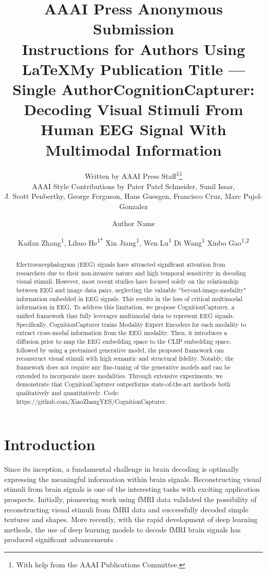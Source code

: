 \documentclass[letterpaper]{article} %
\title{AAAI Press Anonymous Submission\\Instructions for Authors Using \LaTeX{}}
\author{
    Written by AAAI Press Staff\textsuperscript{\rm 1}\thanks{With help from the AAAI Publications Committee.}\\
    AAAI Style Contributions by Pater Patel Schneider,
    Sunil Issar,\\
    J. Scott Penberthy,
    George Ferguson,
    Hans Guesgen,
    Francisco Cruz\equalcontrib,
    Marc Pujol-Gonzalez\equalcontrib
}
\title{My Publication Title --- Single Author}
\author {
    Author Name
}
\title{CognitionCapturer: Decoding Visual Stimuli From Human EEG Signal With Multimodal Information}
\author {
    Kaifan Zhang\textsuperscript{\rm 1},
    Lihuo He\textsuperscript{\rm 1*}
    Xin Jiang\textsuperscript{\rm 1},
    Wen Lu\textsuperscript{\rm 1}
    Di Wang\textsuperscript{\rm 1}
    Xinbo Gao\textsuperscript{\rm 1,2}
}
\begin{document}
\maketitle


\begin{abstract}

Electroencephalogram (EEG) signals have attracted significant attention from researchers due to their non-invasive nature and high temporal sensitivity in decoding visual stimuli. However, most recent studies have focused solely on the relationship between EEG and image data pairs, neglecting the valuable ``beyond-image-modality" information embedded in EEG signals. This results in the loss of critical multimodal information in EEG. To address this limitation, we propose CognitionCapturer, a unified framework that fully leverages multimodal data to represent EEG signals. Specifically, CognitionCapturer trains Modality Expert Encoders for each modality to extract cross-modal information from the EEG modality. Then, it introduces a diffusion prior to map the EEG embedding space to the CLIP embedding space, followed by using a pretrained generative model, the proposed framework can reconstruct visual stimuli with high semantic and structural fidelity. Notably, the framework does not require any fine-tuning of the generative models and can be extended to incorporate more modalities. Through extensive experiments, we demonstrate that CognitionCapturer outperforms state-of-the-art methods both qualitatively and quantitatively. Code: https://github.com/XiaoZhangYES/CognitionCapturer.

\end{abstract}

%

\section{Introduction}


Since its inception, a fundamental challenge in brain decoding is optimally expressing the meaningful information within brain signals. Reconstructing visual stimuli from brain signals is one of the interesting tasks with exciting application prospects. Initially, pioneering work using fMRI data \cite{kay2008identifying, miyawaki2008visual, naselaris2009bayesian} validated the possibility of reconstructing visual stimuli from fMRI data and successfully decoded simple textures and shapes. More recently, with the rapid development of deep learning methods, the use of deep learning models to decode fMRI brain signals has produced significant advancements \cite{ren2021reconstructing, Takagi_2023_CVPR, scotti2024reconstructing}.
\end{document}
